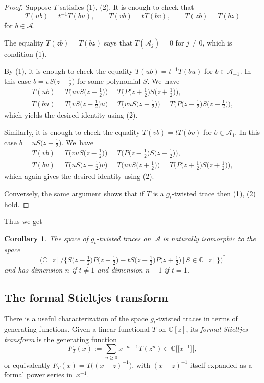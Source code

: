 \documentclass[pdftex]{sigma}
\newcommand{\CN}{\mathbb{C}} %
\newcommand{\mc}[1]{\mathcal{#1}}
\newtheorem{Corollary}[Theorem]{Corollary}
\theoremstyle{definition}
\numberwithin{equation}{section}
\begin{document}
\begin{proof} Suppose $T$ satisfies (1), (2).
It is enough to check that
\[
T(ub)=t^{-1}T(bu),\qquad T(vb)=tT(bv),\qquad T(zb)=T(bz)
\]
for $b\in \mc{A}$.

The equality $T(zb)=T(bz)$ says that $T(\mc A_j)=0$ for $j\ne 0$, which is condition (1).

By (1), it is enough to check the equality $T(ub)=t^{-1} T(bu)$ for $b\in \mc{A}_{-1}$. In this case $b=vS\big(z+\tfrac{1}{2}\big)$ for some polynomial $S$. We~have
\begin{gather*}
T(ub)=T\big(uvS\big(z+\tfrac{1}{2}\big)\big)=T\big(P\big(z+\tfrac{1}{2}\big)S\big(z+\tfrac{1}{2}\big)\big),
\\
T(bu)=T\big(vS\big(z+\tfrac{1}{2}\big)u\big)=T\big(vu S\big(z-\tfrac{1}{2}\big)\big)=T\big(P\big(z-\tfrac{1}{2}\big)S\big(z-\tfrac{1}{2}\big)\big),
\end{gather*}
which yields the desired identity using (2).

Similarly, it is enough to check the equality $T(vb)=tT(bv)$ for $b\in \mc{A}_1$. In this case $b=u S\big(z-\tfrac{1}{2}\big)$. We~have
\begin{gather*}
T(vb)=T\big(vu S\big(z-\tfrac{1}{2}\big)\big)=T\big(P\big(z-\tfrac{1}{2}\big)S\big(z-\tfrac{1}{2}\big)\big),
\\
T(bv)=T\big(u S\big(z-\tfrac{1}{2}\big)v\big)=T\big(uv S\big(z+\tfrac{1}{2}\big)\big)=T\big(P\big(z+\tfrac{1}{2}\big)S\big(z+\tfrac{1}{2}\big)\big),
\end{gather*}
which again gives the desired identity using (2).

Conversely, the same argument shows that if $T$ is a $g_t$-twisted trace
then (1), (2) hold.
\end{proof}

Thus we get

\begin{Corollary}\label{natiso}
The space of $g_t$-twisted traces on~$\mc A$ is naturally isomorphic to the space
\[
\bigl(\CN[z]/\big\{S\big(z-\tfrac{1}{2}\big)P\big(z-\tfrac{1}{2}\big)-t S\big(z+\tfrac{1}{2}\big)P\big(z+\tfrac{1}{2}\big)\,|\, S \in\CN[z]\big\}\bigr)^*
\]
and has dimension $n$ if $t\neq 1$ and dimension $n-1$ if $t=1$.
\end{Corollary}

\subsection{The formal Stieltjes transform}
There is a useful characterization of the space $g_t$-twisted traces in
terms of generating functions. Given a linear functional $T$ on $\CN[z]$,
its {\em formal Stieltjes transform} is the generating function
\[
F_T(x):=\sum_{n\ge 0} x^{-n-1} T(z^n) \in \CN\big[\big[x^{-1}\big]\big],
\]
or equivalently $F_T(x)=T\big((x-z)^{-1}\big)$, with $(x-z)^{-1}$ itself expanded as a
formal power series in~$x^{-1}$.
\end{document}

